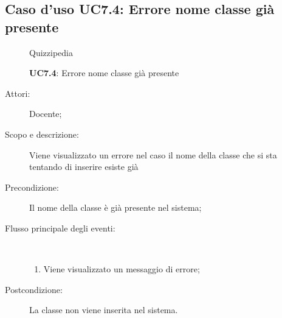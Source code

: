 \subsection{Caso d'uso UC7.4: Errore nome classe già presente}
	\begin{figure}[H]
		\centering
		\begin{resizedtikzpicture}{\textwidth}
		\begin{umlsystem}[x=0, fill=lightgray!20]{Quizzipedia}
		\end{umlsystem}
		\end{resizedtikzpicture}
		\caption{\textbf{UC7.4}: Errore nome classe già presente}
		\label{UC7.4}
	\end{figure}
\begin{description}
\item[Attori:] Docente;
\item[Scopo e descrizione:] Viene visualizzato un errore nel caso il nome della classe che si sta tentando di inserire esiste già
      \item[Precondizione:] Il nome della classe è già presente nel sistema;

        \item[Flusso principale degli eventi:] \ 
 \begin{enumerate}
          \item Viene visualizzato un messaggio di errore;

      \end{enumerate}
    \item[Postcondizione:] La classe non viene inserita nel sistema.
  \end{description}
\hypertarget{UC8}{}
